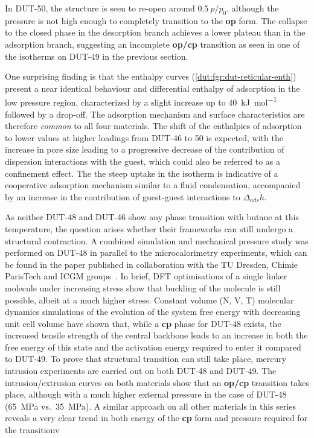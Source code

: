 In DUT-50, the structure is seen to re-open around \(0.5~p/p_0\), although 
the pressure is not high enough to completely transition to the
\textbf{op} form. The collapse to the closed phase in the desorption
branch achieves a lower plateau than in the adsorption branch,
suggesting an incomplete \textbf{op/cp} transition as seen in one 
of the isotherms on DUT-49 in the previous section.

One surprising finding is that the enthalpy curves 
(\autoref{dut:fgr:dut-reticular-enth}) present a near
identical behaviour and differential enthalpy of adsorption in the 
low pressure region, characterized by a slight increase up to 
\SI{40}{\kilo\joule\per\mol} followed by a drop-off. The adsorption
mechanism and surface characteristics are therefore \textit{common} to 
all four materials. The shift of the enthalpies of adsorption to lower 
values at higher loadings from DUT-46 to 50 is expected, with the increase
in pore size leading to a progressive decrease of the contribution 
of dispersion interactions with the guest, which could also be 
referred to as a confinement effect. The the steep uptake in the isotherm
is indicative of a cooperative adsorption mechanism similar to a fluid
condensation, accompanied by an increase in the contribution of 
guest-guest interactions to \(\Delta_{ads} \dot{h}\).

As neither DUT-48 and DUT-46 show any phase transition with
butane at this temperature, the question arises whether their frameworks
can still undergo a structural contraction. A combined simulation and 
mechanical pressure study was performed on DUT-48 in parallel to the 
microcalorimetry experiments, which can be found in the paper 
published in collaboration with the TU Dresden, Chimie ParisTech and 
ICGM groups~\cite{krauseAdsorptionContractionMechanics2018}.
In brief, DFT optimisations of a single linker molecule under increasing
stress show that buckling of the molecule is still possible, albeit
at a much higher stress. Constant volume (N, V, T) molecular dynamics
simulations of the evolution of the system free energy with decreasing
unit cell volume have shown that, while a \textbf{cp} phase for DUT-48
exists, the increased tensile strength of the central backbone leads
to an increase in both the free energy of this state and the activation
energy required to enter it compared to DUT-49. To prove that structural
transition can still take place, mercury intrusion experiments are 
carried out on both DUT-48 and DUT-49. The intrusion/extrusion 
curves on both materials show that an \textbf{op/cp} transition takes
place, although with a much higher external pressure in the case 
of DUT-48 (\SI{65}{\mega\pascal} vs.\ \SI{35}{\mega\pascal}). A similar 
approach on all other materials in this series reveals a very clear
trend in both energy of the \textbf{cp} form and pressure required 
for the transitionv

